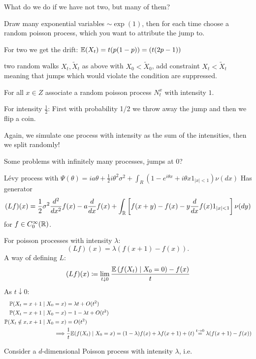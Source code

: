 What do we do if we have not two, but many of them?

Draw many exponential variables $\sim\exp(1)$, then for each time choose a random poisson process, which you want to attribute the jump to.

For two we get the drift: $\mathbb{E}(X_t)=t(p(1-p))=(t(2p-1))$

two random walks $X_t, \tilde{X}_t$ as above with $X_0<\tilde{X}_0$, add constraint $X_t<\tilde{X}_t$ meaning that jumps which would violate the condition are suppressed.

For all $x\in Z$ associate a random poisson process $N_t^x$ with intensity $1$.

For intensity $\frac{1}{2}$: First with probability 1/2 we throw away the jump and then we flip a coin.

Again, we simulate one process with intensity as the sum of the intensities, then we split randomly!

\begin{aremark}
    Some problems with infinitely many processes, jumps at 0?
\end{aremark}


\begin{aremark}
    Lévy process with $\Psi(\theta)=ia\theta+\frac{1}{2}i\theta^2\sigma^2+\int_{R}(1-e^{i\theta x}+i\theta x1_{|x|<1})\nu(dx)$
    Has generator 
    \[(L f)(x)=\frac{1}{2}\sigma^2\frac{d^2}{dx^2}f(x)-a\frac{d}{dx}f(x)+\int_{\mathbb{R}}\left[f(x+y)-f(x)-y\frac{d}{dx}f(x)1_{|x|<1}\right]\nu(dy)\]
    for $f\in C_0^\infty(\mathbb{R})$.
\end{aremark}

For poisson processes with intensity $\lambda$:
\[(L f)(x)=\lambda(f(x+1)-f(x)).\]
A way of defining $L$:
\[(Lf)(x)\coloneqq \lim_{t\downarrow 0}\frac{\mathbb{E}\left(f(X_t)\mid X_0=0\right)-f(x)}{t}\]
As $t\downarrow 0$:
\begin{align*}
    \mathbb{P}(X_t=x+1\mid X_0=x)&=\lambda t + O(t^2)\\
    \mathbb{P}(X_t=x+1\mid X_0=x)&=1- \lambda t + O(t^2)\\
    \mathbb{P}(X_t\notin{x,x+1}\mid X_0=x)&=O(t^2)\\
    \implies & \frac{1}{t}\mathbb{E}(f(X_t)\mid X_0=x)=(1-\lambda)f(x)+\lambda f(x+1)+(t)\stackrel{t\to 0}{=}\lambda(f(x+1)-f(x))
\end{align*}

Consider a $d$-dimensional Poisson process with intensity $\lambda$, i.e. 

